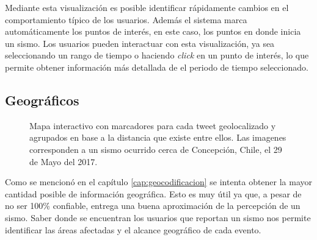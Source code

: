 	Mediante esta visualización es posible identificar rápidamente cambios en el comportamiento típico de los usuarios.
	Además el sistema marca automáticamente los puntos de interés, en este caso, los puntos en donde inicia un sismo. 
	Los usuarios pueden interactuar con esta visualización, ya sea seleccionando un rango de tiempo o haciendo \textit{click} en un punto de interés, lo que permite obtener información más detallada de el periodo de tiempo seleccionado. 
	
	
	\subsection{Geográficos}
	
	\begin{figure}[ht]
	\centering
	\hfill
  	\caption{Mapa interactivo con marcadores para cada tweet geolocalizado y agrupados en base a la distancia que existe entre ellos. Las imagenes corresponden a un sismo ocurrido cerca de  Concepción, Chile, el 29 de Mayo del 2017.}
  	\label{fig:worldmap}
  	\end{figure}
	 	
	  	
	Como se mencionó en el capítulo \ref{cap:geocodificacion} se intenta obtener la mayor cantidad posible de información geográfica. 
	Esto es muy útil ya que, a pesar de no ser 100\% confiable, entrega una buena aproximación de la percepción de un sismo. 
	Saber donde se encuentran los usuarios que reportan un sismo nos permite identificar las áreas afectadas y el alcance geográfico de cada evento. 

